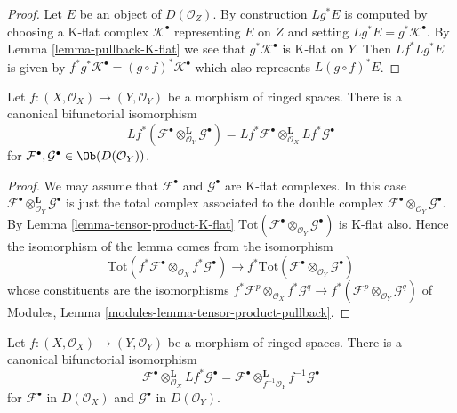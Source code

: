 \begin{proof}
Let $E$ be an object of $D(\mathcal{O}_Z)$.
By construction $Lg^*E$ is computed by choosing a K-flat complex
$\mathcal{K}^\bullet$ representing $E$ on $Z$ and
setting $Lg^*E = g^*\mathcal{K}^\bullet$.
By Lemma \ref{lemma-pullback-K-flat} we see that $g^*\mathcal{K}^\bullet$
is K-flat on $Y$. Then $Lf^*Lg^*E$ is given by
$f^*g^*\mathcal{K}^\bullet = (g \circ f)^*\mathcal{K}^\bullet$
which also represents $L(g \circ f)^*E$.
\end{proof}

\begin{lemma}
\label{lemma-pullback-tensor-product}
Let $f : (X, \mathcal{O}_X) \to (Y, \mathcal{O}_Y)$
be a morphism of ringed spaces. There is a canonical bifunctorial
isomorphism
$$
Lf^*(
\mathcal{F}^\bullet \otimes_{\mathcal{O}_Y}^{\mathbf{L}} \mathcal{G}^\bullet
) =
Lf^*\mathcal{F}^\bullet
\otimes_{\mathcal{O}_X}^{\mathbf{L}}
Lf^*\mathcal{G}^\bullet
$$
for $\mathcal{F}^\bullet, \mathcal{G}^\bullet \in \Ob(D(\mathcal{O}_Y))$.
\end{lemma}

\begin{proof}
We may assume that $\mathcal{F}^\bullet$ and $\mathcal{G}^\bullet$
are K-flat complexes. In this case
$\mathcal{F}^\bullet \otimes_{\mathcal{O}_Y}^{\mathbf{L}} \mathcal{G}^\bullet$
is just the total complex associated to the double complex
$\mathcal{F}^\bullet \otimes_{\mathcal{O}_Y} \mathcal{G}^\bullet$.
By
Lemma \ref{lemma-tensor-product-K-flat}
$\text{Tot}(\mathcal{F}^\bullet \otimes_{\mathcal{O}_Y} \mathcal{G}^\bullet)$
is K-flat also. Hence the isomorphism of the lemma comes from the
isomorphism
$$
\text{Tot}(f^*\mathcal{F}^\bullet \otimes_{\mathcal{O}_X}
f^*\mathcal{G}^\bullet)
\longrightarrow
f^*\text{Tot}(\mathcal{F}^\bullet \otimes_{\mathcal{O}_Y} \mathcal{G}^\bullet)
$$
whose constituents are the isomorphisms
$f^*\mathcal{F}^p \otimes_{\mathcal{O}_X} f^*\mathcal{G}^q \to
f^*(\mathcal{F}^p \otimes_{\mathcal{O}_Y} \mathcal{G}^q)$ of
Modules, Lemma \ref{modules-lemma-tensor-product-pullback}.
\end{proof}

\begin{lemma}
\label{lemma-variant-derived-pullback}
Let $f : (X, \mathcal{O}_X) \to (Y, \mathcal{O}_Y)$
be a morphism of ringed spaces. There is a canonical bifunctorial
isomorphism
$$
\mathcal{F}^\bullet
\otimes_{\mathcal{O}_X}^{\mathbf{L}}
Lf^*\mathcal{G}^\bullet
=
\mathcal{F}^\bullet
\otimes_{f^{-1}\mathcal{O}_Y}^{\mathbf{L}}
f^{-1}\mathcal{G}^\bullet
$$
for $\mathcal{F}^\bullet$ in $D(\mathcal{O}_X)$ and
$\mathcal{G}^\bullet$ in $D(\mathcal{O}_Y)$.
\end{lemma}

